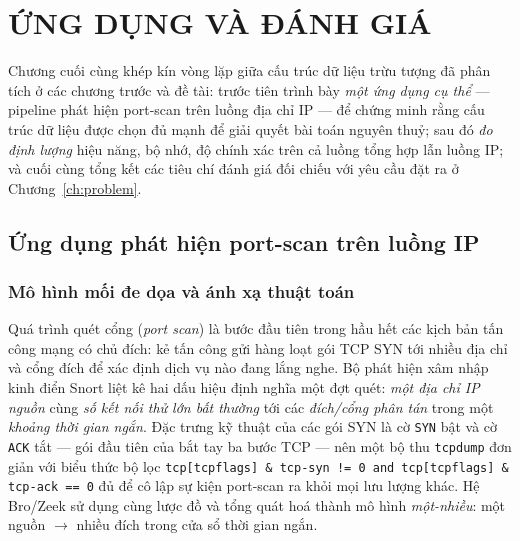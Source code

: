 
\chapter{ỨNG DỤNG VÀ ĐÁNH GIÁ}
\label{ch:application}
\label{ch:eval}

Chương cuối cùng khép kín vòng lặp giữa cấu trúc dữ liệu trừu tượng đã phân tích ở các chương trước và đề tài: trước tiên trình bày \textit{một ứng dụng cụ thể} ---  pipeline phát hiện port-scan trên luồng địa chỉ IP --- để chứng minh rằng cấu trúc dữ liệu được chọn đủ mạnh để giải quyết bài toán nguyên thuỷ; sau đó \textit{đo định lượng} hiệu năng, bộ nhớ, độ chính xác trên cả luồng tổng hợp lẫn luồng IP; và cuối cùng tổng kết các tiêu chí đánh giá đối chiếu với yêu cầu đặt ra ở Chương~\ref{ch:problem}.

\section{Ứng dụng phát hiện port-scan trên luồng IP}
\label{sec:portscan-app}

\subsection{Mô hình mối đe dọa và ánh xạ thuật toán}
\label{sec:portscan-model}

Quá trình quét cổng (\textit{port scan}) là bước đầu tiên trong hầu hết các kịch bản tấn công mạng có chủ đích: kẻ tấn công gửi hàng loạt gói TCP SYN tới nhiều địa chỉ và cổng đích để xác định dịch vụ nào đang lắng nghe. Bộ phát hiện xâm nhập kinh điển Snort \cite{roesch1999snort} liệt kê hai dấu hiệu định nghĩa một đợt quét: \textit{một địa chỉ IP nguồn} cùng \textit{số kết nối thử lớn bất thường} tới các \textit{đích/cổng phân tán} trong một \textit{khoảng thời gian ngắn}. Đặc trưng kỹ thuật của các gói SYN là cờ \texttt{SYN} bật và cờ \texttt{ACK} tắt --- gói đầu tiên của bắt tay ba bước TCP --- nên một bộ thu \texttt{tcpdump} đơn giản với biểu thức bộ lọc \texttt{tcp[tcpflags] \& tcp-syn != 0 and tcp[tcpflags] \& tcp-ack == 0} đủ để cô lập sự kiện port-scan ra khỏi mọi lưu lượng khác. Hệ Bro/Zeek \cite{paxson1999bro} sử dụng cùng lược đồ và tổng quát hoá thành mô hình \textit{một-nhiều}: một nguồn $\rightarrow$ nhiều đích trong cửa sổ thời gian ngắn.

